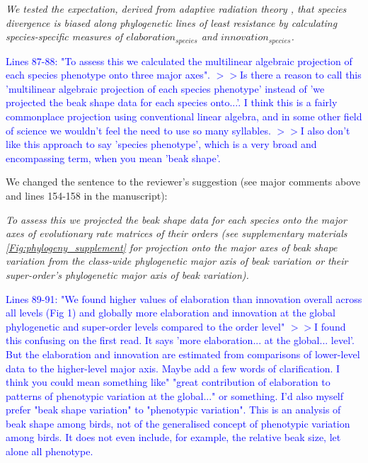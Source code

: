\documentclass[12pt,letterpaper]{article}
\begin{document}
{\noindent\textit{We tested the expectation, derived from adaptive radiation theory \cite{schluter1996adaptive,mcglothlin2018adaptive,slater2019hierarchy} %
, that species divergence is biased along phylogenetic lines of least resistance by calculating species-specific measures of $elaboration_{species}$ and $innovation_{species}$.}

\textcolor{blue}{Lines 87-88: "To assess this we calculated the multilinear algebraic projection of each species phenotype onto three major axes".
$>>$Is there a reason to call this 'multilinear algebraic projection of each species phenotype' instead of 'we projected the beak shape data for each species onto...'. I think this is a fairly commonplace projection using conventional linear algebra, and in some other field of science we wouldn't feel the need to use so many syllables.
$>>$I also don't like this approach to say 'species phenotype', which is a very broad and encompassing term, when you mean 'beak shape'.}

We changed the sentence to the reviewer’s suggestion (see major comments above and lines 154-158 in the manuscript):

\noindent\textit{To assess this we projected the beak shape data for each species onto %
the major axes of evolutionary rate matrices of their orders (see supplementary materials \ref{Fig:phylogeny_supplement} for projection onto the major axes of beak shape variation from the class-wide phylogenetic major axis of beak variation or their super-order’s phylogenetic major axis of beak variation).}

\textcolor{blue}{Lines 89-91: "We found higher values of elaboration than innovation overall across all levels (Fig 1) and globally more elaboration and innovation at the global phylogenetic and super-order levels compared to the order level"
$>>$I found this confusing on the first read. It says 'more elaboration... at the global... level'. But the elaboration and innovation are estimated from comparisons of lower-level data to the higher-level major axis. Maybe add a few words of clarification. I think you could mean something like" "great contribution of elaboration to patterns of phenotypic variation at the global..." or something. I'd also myself prefer "beak shape variation" to "phenotypic variation". This is an analysis of beak shape among birds, not of the generalised concept of phenotypic variation among birds. It does not even include, for example, the relative beak size, let alone all phenotype.}

}
\end{document}
